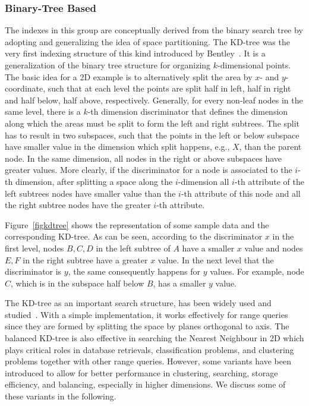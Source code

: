 \documentclass[a4paper,12pt]{article}
\begin{document}
\subsubsection{Binary-Tree Based}
\label{binary-tree-based}
The indexes in this group are conceptually derived from the binary search tree by adopting and generalizing the idea of space partitioning. 
The KD-tree was the very first indexing structure of this kind introduced by Bentley~\cite{bently1975}. 
It is a generalization of the binary tree structure for organizing $k$-dimensional points. The basic idea for a 2D example is to alternatively split the area by $x$- and $y$-coordinate, such that at each level the points are split half in left, half in right and half below, half above, respectively. Generally, for every non-leaf nodes in the same level, there is a $k$-th dimension discriminator that defines the dimension along which the areas must be split to form the left and right subtrees. The split has to result in two subspaces, such that the points in the left or below subspace have smaller value in the dimension which split happens, e.g., $X$, than the parent node. In the same dimension, all nodes in the right or above subspaces have greater values. More clearly, if the discriminator for a node is associated to the $i$-th dimension, after splitting a space along the $i$-dimension all $i$-th attribute of the left subtrees nodes have smaller value than the $i$-th attribute of this node and all the right subtree nodes have the greater $i$-th attribute. 

Figure~\ref{figkdtree} shows the representation of some sample data and the corresponding KD-tree. As can be seen, according to the discriminator $x$ in the first level, nodes $B, C, D$ in the left subtree of $A$ have a smaller $x$ value and nodes $E, F$ in the right subtree have a greater $x$ value. In the next level that the discriminator is $y$, the same consequently happens for $y$ values. For example, node $C$, which is in the subspace half below $B$, has a smaller $y$ value.

The KD-tree as an important search structure, has been widely used and studied~\cite{ilprints723}. With a simple implementation, it works effectively for range queries since they are formed by splitting the space by planes orthogonal to axis. The balanced KD-tree is also effective in searching the Nearest Neighbour in 2D which plays critical roles in database retrievals, classification problems, and clustering problems together with other range queries. However, some variants have been introduced to allow for better performance in clustering, searching, storage efficiency,  
and balancing, especially in higher dimensions. We discuss some of these variants in the following.
\end{document}
